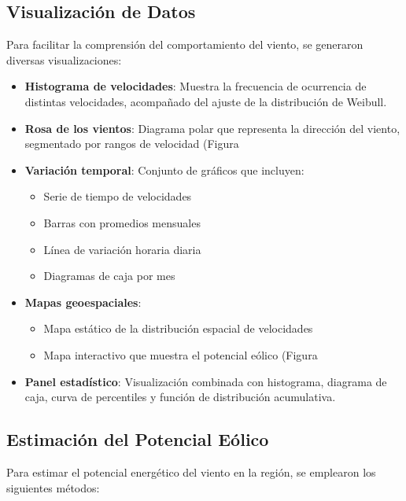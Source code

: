 \documentclass[a4paper,12pt]{article}
\begin{document}
		\subsection{Visualización de Datos}
		\label{subsec:visualizacion}
		
		Para facilitar la comprensión del comportamiento del viento, se generaron diversas visualizaciones:
		
		\begin{itemize}
			\item \textbf{Histograma de velocidades}: Muestra la frecuencia de ocurrencia de distintas velocidades, acompañado del ajuste de la distribución de Weibull.
			\item \textbf{Rosa de los vientos}: Diagrama polar que representa la dirección del viento, segmentado por rangos de velocidad (Figura %
			\item \textbf{Variación temporal}: Conjunto de gráficos que incluyen:
			\begin{itemize}
				\item Serie de tiempo de velocidades
				\item Barras con promedios mensuales
				\item Línea de variación horaria diaria
				\item Diagramas de caja por mes
			\end{itemize}
			\item \textbf{Mapas geoespaciales}:
			\begin{itemize}
				\item Mapa estático de la distribución espacial de velocidades
				\item Mapa interactivo que muestra el potencial eólico (Figura %
			\end{itemize}
			\item \textbf{Panel estadístico}: Visualización combinada con histograma, diagrama de caja, curva de percentiles y función de distribución acumulativa.
		\end{itemize}
		
		\subsection{Estimación del Potencial Eólico}
		\label{subsec:potencial}
		
		Para estimar el potencial energético del viento en la región, se emplearon los siguientes métodos:
		
\end{document}
